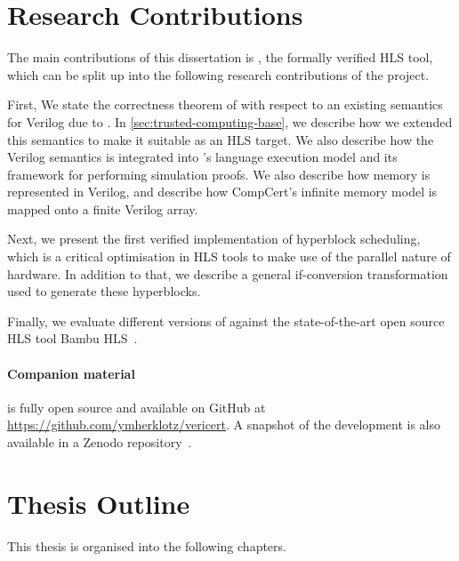 \section{Research Contributions}%
\label{sec:intro:research-contributions}

The main contributions of this dissertation is \vericert{}, the formally
verified \gls{HLS} tool, which can be split up into the following research
contributions of the project.

First, We state the correctness theorem of \vericert{} with respect to an
existing semantics for Verilog due to
\textcite{lööw19_proof_trans_veril_devel_hol}. In
\cref{sec:trusted-computing-base}, we describe how we extended this semantics to
make it suitable as an \gls{HLS} target.  We also describe how the Verilog
semantics is integrated into \compcert{}'s language execution model and its
framework for performing simulation proofs.  We also describe how memory is
represented in Verilog, and describe how CompCert's infinite memory model is
mapped onto a finite Verilog array.

Next, we present the first verified implementation of hyperblock scheduling,
which is a critical optimisation in \gls{HLS} tools to make use of the parallel
nature of hardware.  In addition to that, we describe a general if-conversion
transformation used to generate these hyperblocks.

Finally, we evaluate different versions of \vericert{} against the
state-of-the-art open source \gls{HLS} tool Bambu HLS~\cite{bambu_hls}.

\paragraph{Companion material}
\vericert{} is fully open source and available on GitHub at
\url{https://github.com/ymherklotz/vericert}. A snapshot of the \vericert{}
development is also available in a Zenodo
repository~\cite{yann_herklotz_2021_5093839}.

\section{Thesis Outline}

This thesis is organised into the following chapters.

